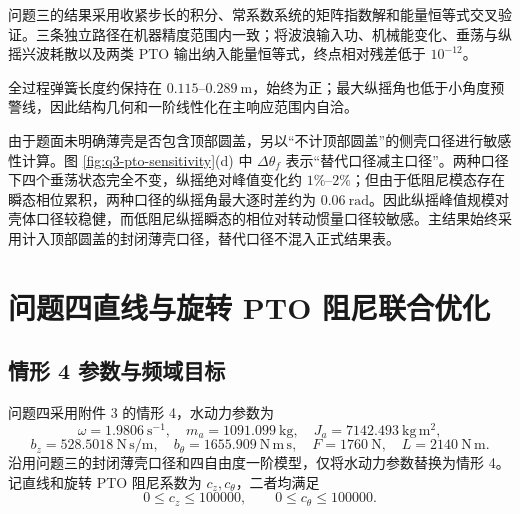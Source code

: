 \documentclass[withoutpreface]{../../../templates/CUMCM2026-Complete-LaTeX/cumcmthesis}
\begin{document}
问题三的结果采用收紧步长的积分、常系数系统的矩阵指数解和能量恒等式交叉验证。三条独立路径在机器精度范围内一致；将波浪输入功、机械能变化、垂荡与纵摇兴波耗散以及两类 PTO 输出纳入能量恒等式，终点相对残差低于 $10^{-12}$。

全过程弹簧长度约保持在 $0.115$--$0.289\ \mathrm{m}$，始终为正；最大纵摇角也低于小角度预警线，因此结构几何和一阶线性化在主响应范围内自洽。

由于题面未明确薄壳是否包含顶部圆盖，另以“不计顶部圆盖”的侧壳口径进行敏感性计算。图 \ref{fig:q3-pto-sensitivity}(d) 中 $\Delta\theta_f$ 表示“替代口径减主口径”。两种口径下四个垂荡状态完全不变，纵摇绝对峰值变化约 $1\%$--$2\%$；但由于低阻尼模态存在瞬态相位累积，两种口径的纵摇角最大逐时差约为 $0.06\ \mathrm{rad}$。因此纵摇峰值规模对壳体口径较稳健，而低阻尼纵摇瞬态的相位对转动惯量口径较敏感。主结果始终采用计入顶部圆盖的封闭薄壳口径，替代口径不混入正式结果表。

\section{问题四直线与旋转 PTO 阻尼联合优化}

\subsection{情形 4 参数与频域目标}

问题四采用附件 3 的情形 4，水动力参数为
\begin{equation}
  \omega=1.9806\ \mathrm{s^{-1}},\quad
  m_a=1091.099\ \mathrm{kg},\quad
  J_a=7142.493\ \mathrm{kg\,m^2},
  \label{eq:q4-hydrodynamic-1}
\end{equation}
\begin{equation}
  b_z=528.5018\ \mathrm{N\,s/m},\quad
  b_\theta=1655.909\ \mathrm{N\,m\,s},\quad
  F=1760\ \mathrm{N},\quad L=2140\ \mathrm{N\,m}.
  \label{eq:q4-hydrodynamic-2}
\end{equation}
沿用问题三的封闭薄壳口径和四自由度一阶模型，仅将水动力参数替换为情形 4。记直线和旋转 PTO 阻尼系数为 $c_z,c_\theta$，二者均满足
\begin{equation}
  0\leq c_z\leq100000,\qquad 0\leq c_\theta\leq100000.
  \label{eq:q4-bounds}
\end{equation}
\end{document}
